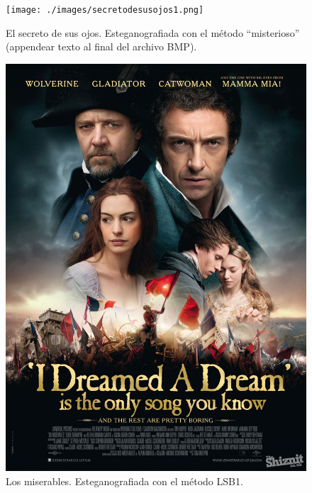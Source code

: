 \documentclass[a4paper,10pt]{article}
\begin{document}
\begin{figure}[!htb]
   \texttt{[image: ./images/secretodesusojos1.png]}
  \caption{El secreto de sus ojos. Esteganografiada con el método ``misterioso'' (appendear texto al final del archivo BMP).}\label{fig:awesome_image1}
\endminipage\hfill
{}
   \includegraphics[scale=0.15]{./images/miserables2.png}
  \caption{Los miserables. Esteganografiada con el método LSB1.}\label{fig:awesome_image2}
\endminipage\hfill
\end{figure}
\end{document}
